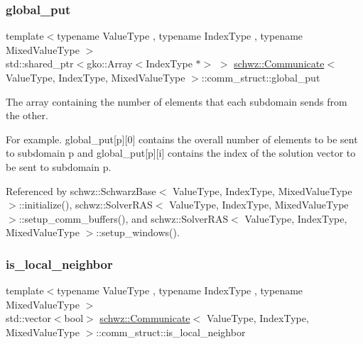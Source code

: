 \subsubsection{\texorpdfstring{global\+\_\+put}{global\_put}}
{\footnotesize\ttfamily template$<$typename Value\+Type , typename Index\+Type , typename Mixed\+Value\+Type $>$ \\
std\+::shared\+\_\+ptr$<$gko\+::\+Array$<$Index\+Type $\ast$$>$ $>$ \hyperlink{classschwz_1_1Communicate}{schwz\+::\+Communicate}$<$ Value\+Type, Index\+Type, Mixed\+Value\+Type $>$\+::comm\+\_\+struct\+::global\+\_\+put}



The array containing the number of elements that each subdomain sends from the other. 

For example. global\+\_\+put\mbox{[}p\mbox{]}\mbox{[}0\mbox{]} contains the overall number of elements to be sent to subdomain p and global\+\_\+put\mbox{[}p\mbox{]}\mbox{[}i\mbox{]} contains the index of the solution vector to be sent to subdomain p. 

Referenced by schwz\+::\+Schwarz\+Base$<$ Value\+Type, Index\+Type, Mixed\+Value\+Type $>$\+::initialize(), schwz\+::\+Solver\+R\+A\+S$<$ Value\+Type, Index\+Type, Mixed\+Value\+Type $>$\+::setup\+\_\+comm\+\_\+buffers(), and schwz\+::\+Solver\+R\+A\+S$<$ Value\+Type, Index\+Type, Mixed\+Value\+Type $>$\+::setup\+\_\+windows().

\mbox{\label{structschwz_1_1Communicate_1_1comm__struct_ae36319cfa4fc09154135a2b121377d3b}} 
\subsubsection{\texorpdfstring{is\+\_\+local\+\_\+neighbor}{is\_local\_neighbor}}
{\footnotesize\ttfamily template$<$typename Value\+Type , typename Index\+Type , typename Mixed\+Value\+Type $>$ \\
std\+::vector$<$bool$>$ \hyperlink{classschwz_1_1Communicate}{schwz\+::\+Communicate}$<$ Value\+Type, Index\+Type, Mixed\+Value\+Type $>$\+::comm\+\_\+struct\+::is\+\_\+local\+\_\+neighbor}



